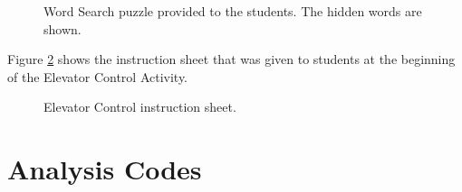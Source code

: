 	\begin{figure}%
   	\centering
   		\fbox{
   		}
   	\caption[Word Search puzzle.]{Word Search puzzle provided to the students. The hidden words are shown.}
   	\label{fig:wordsearch-puzzle}
	\end{figure}




	\label{sec:elevator_handout}
	Figure \ref{fig:elevator-instructions} shows the instruction sheet that was given to students at the beginning of the Elevator Control Activity.

	\begin{figure}%
   	\centering
   		\fbox{
   		}
   	\caption{Elevator Control instruction sheet.}
   	\label{fig:elevator-instructions}
	\end{figure}

\chapter{Analysis Codes}

